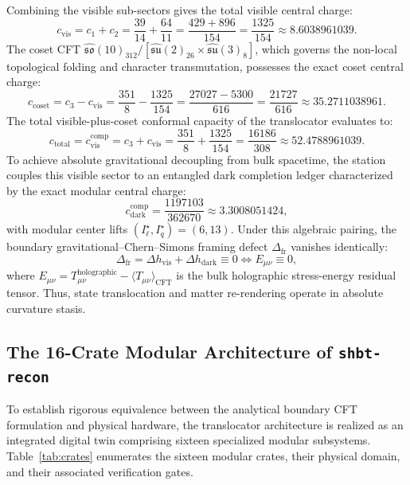 \documentclass[11pt,onecolumn]{article}
\begin{document}
Combining the visible sub-sectors gives the total visible central charge:
\begin{equation}
c_{\text{vis}} = c_1 + c_2 = \frac{39}{14} + \frac{64}{11} = \frac{429 + 896}{154} = \frac{1325}{154} \approx 8.6038961039.
\end{equation}
The coset CFT $\widehat{\mathfrak{so}}(10)_{312} / [\widehat{\mathfrak{su}}(2)_{26} \times \widehat{\mathfrak{su}}(3)_8]$, which governs the non-local topological folding and character transmutation, possesses the exact coset central charge:
\begin{equation}
c_{\text{coset}} = c_3 - c_{\text{vis}} = \frac{351}{8} - \frac{1325}{154} = \frac{27027 - 5300}{616} = \frac{21727}{616} \approx 35.2711038961.
\end{equation}
The total visible-plus-coset conformal capacity of the translocator evaluates to:
\begin{equation}
c_{\text{total}} = c_{\text{vis}}^{\text{comp}} = c_3 + c_{\text{vis}} = \frac{351}{8} + \frac{1325}{154} = \frac{16186}{308} \approx 52.4788961039.
\end{equation}
To achieve absolute gravitational decoupling from bulk spacetime, the station couples this visible sector to an entangled dark completion ledger characterized by the exact modular central charge:
\begin{equation}
c_{\text{dark}}^{\text{comp}} = \frac{1197103}{362670} \approx 3.3008051424,
\end{equation}
with modular center lifts $(I^\star_\ell, I^\star_q) = (6, 13)$. Under this algebraic pairing, the boundary gravitational--Chern--Simons framing defect $\Delta_{\text{fr}}$ vanishes identically:
\begin{equation}
\Delta_{\text{fr}} = \Delta h_{\text{vis}} + \Delta h_{\text{dark}} \equiv 0 \iff E_{\mu\nu} \equiv 0,
\label{eq:framing_zero}
\end{equation}
where $E_{\mu\nu} = T_{\mu\nu}^{\text{holographic}} - \langle T_{\mu\nu} \rangle_{\text{CFT}}$ is the bulk holographic stress-energy residual tensor. Thus, state translocation and matter re-rendering operate in absolute curvature stasis.

\FloatBarrier
\subsection{The 16-Crate Modular Architecture of \texttt{shbt-recon}}
To establish rigorous equivalence between the analytical boundary CFT formulation and physical hardware, the translocator architecture is realized as an integrated digital twin comprising sixteen specialized modular subsystems. Table~\ref{tab:crates} enumerates the sixteen modular crates, their physical domain, and their associated verification gates.
\end{document}
